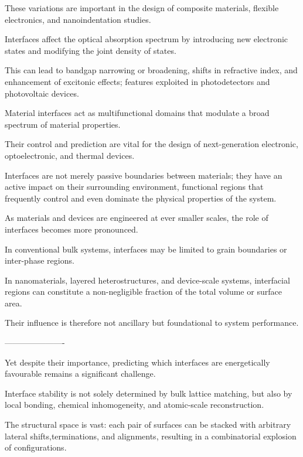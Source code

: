 These variations are important in the design of composite materials, flexible electronics, and nanoindentation studies.

\label{para:interface_optical_effects} %

Interfaces affect the optical absorption spectrum by introducing new electronic states and modifying the joint density
of states.

This can lead to bandgap narrowing or broadening, shifts in refractive index, and enhancement of excitonic effects;
features exploited in photodetectors and photovoltaic devices.

\label{para:interface_summary} %

Material interfaces act as multifunctional domains that modulate a broad spectrum of material
properties.

Their control and prediction are vital for the design of next-generation electronic, optoelectronic, and thermal
devices.

\label{para:interface_functional_regions} %

Interfaces are not merely passive boundaries between materials; they have an active impact on their surrounding
environment, functional regions that frequently control and even dominate the physical properties of the system.

As materials and devices are engineered at ever smaller scales, the role of interfaces becomes more pronounced.

In conventional bulk systems, interfaces may be limited to grain boundaries or inter-phase regions.

In nanomaterials, layered heterostructures, and device-scale systems, interfacial regions can constitute a
non-negligible fraction of the total volume or surface area.

Their influence is therefore not ancillary but foundational to system performance.

----------------------

\label{para:interface_stability_challenge} %

Yet despite their importance, predicting which interfaces are energetically favourable remains a significant challenge.

Interface stability is not solely determined by bulk lattice matching, but also by local bonding, chemical
inhomogeneity, and atomic-scale reconstruction.

The structural space is vast: each pair of surfaces can be stacked with arbitrary lateral shifts,terminations, and
alignments, resulting in a combinatorial explosion of configurations.

